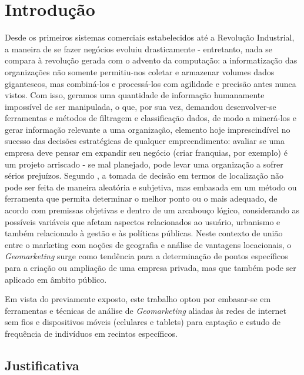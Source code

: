 
\chapter{Introdução}
\label{introducao}

Desde os primeiros sistemas comerciais estabelecidos até a Revolução Industrial, a maneira de se fazer negócios evoluiu drasticamente - entretanto, nada se compara à revolução gerada com o advento da computação: a informatização das organizações não somente permitiu-nos coletar e armazenar volumes dados gigantescos, mas combiná-los e processá-los com agilidade e precisão antes nunca vistos. Com isso, geramos uma quantidade de informação humanamente impossível de ser manipulada, o que, por sua vez, demandou desenvolver-se ferramentas e métodos de filtragem e classificação dados, de modo a minerá-los e gerar informação relevante a uma organização, elemento hoje imprescindível no sucesso das decisões estratégicas de qualquer empreendimento: avaliar se uma empresa deve pensar em expandir seu negócio (criar franquias, por exemplo) é um projeto arriscado - se mal planejado, pode levar uma organização a sofrer sérios prejuízos. Segundo , a tomada de decisão em termos de localização não pode ser feita de maneira aleatória e subjetiva, mas embasada em um método ou ferramenta que permita
determinar o melhor ponto ou o mais adequado, de acordo com premissas objetivas e dentro
de um arcabouço lógico, considerando as possíveis variáveis que afetam aspectos
relacionados ao usuário, urbanismo e também relacionado à gestão e às políticas públicas. Neste contexto de união entre o marketing com noções de geografia e análise de vantagens
locacionais, o \emph{Geomarketing} surge como tendência para a determinação de pontos específicos
para a criação ou ampliação de uma empresa privada, mas que também pode ser aplicado em âmbito público. 

Em vista do previamente exposto, este trabalho optou por embasar-se em ferramentas e técnicas de análise de \emph{Geomarketing} aliadas às redes de internet sem fios e dispositivos móveis (celulares e tablets) para captação e estudo de frequência de indivíduos em recintos específicos.

\section{Justificativa}
\label{justificativa}

